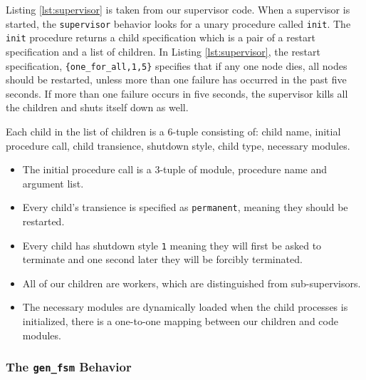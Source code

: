 \documentclass[10pt,letter]{article}
\begin{document}
Listing \ref{lst:supervisor} is taken from our supervisor code. When a
supervisor is started, the \texttt{supervisor} behavior looks for a unary
procedure called \lstinline!init!. The \lstinline!init! procedure returns a
child specification which is a pair of a restart specification and a list of
children. In Listing \ref{lst:supervisor}, the restart specification,
\lstinline!{one_for_all,1,5}! specifies that if any one node dies, all nodes
should be restarted, unless more than one failure has occurred in the past five
seconds. If more than one failure occurs in five seconds, the supervisor kills
all the children and shuts itself down as well.

Each child in the list of children is a 6-tuple consisting of: child name,
initial procedure call, child transience, shutdown style, child type, necessary
modules.

\begin{itemize}
\item The initial procedure call is a 3-tuple of module, procedure name and
  argument list.
\item Every child's transience is specified as \lstinline!permanent!, meaning
  they should be restarted.
\item Every child has shutdown style \lstinline!1! meaning they will first be
  asked to terminate and one second later they will be forcibly terminated.
\item All of our children are workers, which are distinguished from
  sub-supervisors.
\item The necessary modules are dynamically loaded when the child processes is
  initialized, there is a one-to-one mapping between our children and code
  modules.
\end{itemize}

\subsubsection{The \texttt{gen\_fsm} Behavior}
\end{document}
